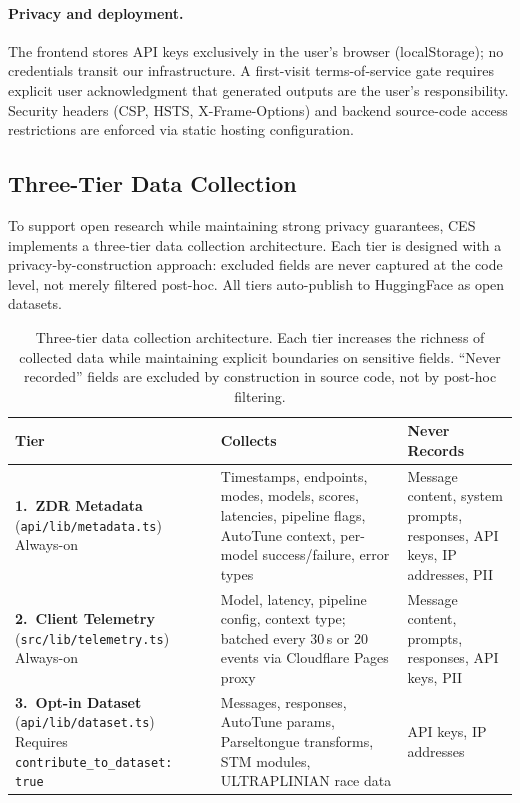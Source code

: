 \documentclass[11pt]{article}
\begin{document}
\paragraph{Privacy and deployment.} The frontend stores API keys exclusively in the user's browser (localStorage); no credentials transit our infrastructure. A first-visit terms-of-service gate requires explicit user acknowledgment that generated outputs are the user's responsibility. Security headers (CSP, HSTS, X-Frame-Options) and backend source-code access restrictions are enforced via static hosting configuration.

\subsection{Three-Tier Data Collection}
\label{sec:datacollection}

To support open research while maintaining strong privacy guarantees, CES implements a three-tier data collection architecture. Each tier is designed with a privacy-by-construction approach: excluded fields are never captured at the code level, not merely filtered post-hoc. All tiers auto-publish to HuggingFace as open datasets.

\begin{table}[t]
\caption{Three-tier data collection architecture. Each tier increases the richness of collected data while maintaining explicit boundaries on sensitive fields. ``Never recorded'' fields are excluded by construction in source code, not by post-hoc filtering.}
\label{tab:datacollection}
\centering
\small
\begin{tabular}{@{}p{2.4cm}p{4.2cm}p{4.2cm}@{}}
\toprule
Tier & Collects & Never Records \\
\midrule
\textbf{1.\ ZDR Metadata} \newline (\texttt{api/lib/metadata.ts}) \newline Always-on &
Timestamps, endpoints, modes, models, scores, latencies, pipeline flags, AutoTune context, per-model success/failure, error types &
Message content, system prompts, responses, API keys, IP addresses, PII \\
\midrule
\textbf{2.\ Client Telemetry} \newline (\texttt{src/lib/telemetry.ts}) \newline Always-on &
Model, latency, pipeline config, context type; batched every 30\,s or 20 events via Cloudflare Pages proxy &
Message content, prompts, responses, API keys, PII \\
\midrule
\textbf{3.\ Opt-in Dataset} \newline (\texttt{api/lib/dataset.ts}) \newline Requires \texttt{contribute\_to\_dataset: true} &
Messages, responses, AutoTune params, Parseltongue transforms, STM modules, ULTRAPLINIAN race data &
API keys, IP addresses \\
\bottomrule
\end{tabular}
\end{table}
\end{document}
